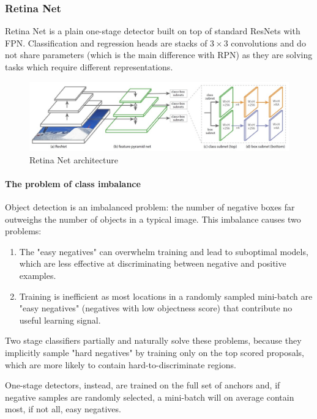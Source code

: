 \subsubsection{Retina Net}

Retina Net is a plain one-stage detector built on top of standard ResNets with FPN.
Classification and regression heads are stacks of $3\times 3$ convolutions and do not share parameters (which is the main difference with RPN) as they are solving tasks which require different representations.

\begin{figure}[htbp]
  \centering
  \includegraphics[width=0.9\linewidth]{./img/retina_net.jpg}
  \caption{Retina Net architecture}
\end{figure}

\paragraph{The problem of class imbalance}
Object detection is an imbalanced problem: the number of negative boxes far outweighs the number of objects in a typical image.
This imbalance causes two problems:
\begin{enumerate}
  \item The "easy negatives" can overwhelm training and lead to suboptimal models, which are less effective at discriminating between negative and positive examples.
  \item Training is inefficient as most locations in a randomly sampled mini-batch are "easy negatives" (negatives with low objectness score) that contribute no useful learning signal.
\end{enumerate}

Two stage classifiers partially and naturally solve these problems, because they implicitly sample "hard negatives" by training only on the top scored proposals, which are more likely to contain hard-to-discriminate regions.

One-stage detectors, instead, are trained on the full set of anchors and, if negative samples are randomly selected, a mini-batch will on average contain most, if not all, easy negatives.

